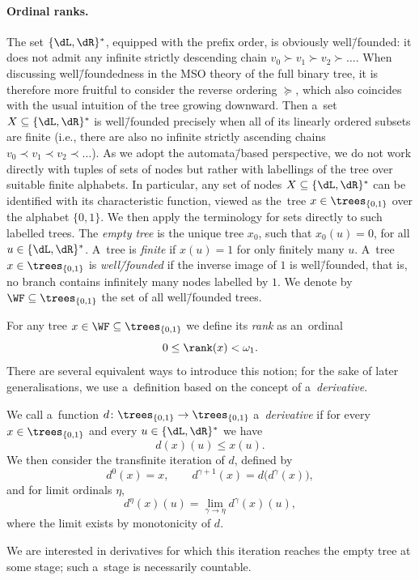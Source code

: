 \documentclass{lmcs}
\numberwithin{equation}{section}
\numberwithin{figure}{section}
\begin{document}
\paragraph*{Ordinal ranks.}
The set $\{\dL,\dR\}^\ast$,
equipped with the prefix order, is obviously well\=/founded: it does not admit any infinite strictly descending chain $v_0 \succ v_1 \succ v_2 \succ \ldots$.
When discussing well\=/foundedness in the MSO theory of the full binary tree, it is therefore more fruitful to consider the reverse ordering
$\succeq$, which also coincides with the usual intuition of the tree growing downward.
Then a~set $X \subseteq \{\dL,\dR\}^\ast$ is well\=/founded precisely when all of its linearly ordered subsets are finite
(i.e., there are also no infinite strictly ascending chains $v_0 \prec v_1 \prec v_2 \prec \ldots$).
As we adopt the automata\=/based perspective, we do not work directly with tuples of
sets of nodes but rather with labellings of the tree over suitable finite alphabets. In particular, any set of nodes
$X\subseteq \{\dL,\dR\}^\ast$ can be identified with its characteristic function, viewed as the~tree $x\in\trees_{\{0,1\}}$ over the alphabet $\{0,1\}$.
We then apply the terminology for sets directly to such labelled trees.
The \emph{empty tree} is the unique tree $x_0$, such that $x_0(u)=0$, for all $u\in\{\dL,\dR\}^\ast$.
A~tree is \emph{finite} if $x(u)=1$ for only finitely many $u$.
A~tree $x\in\trees_{\{0,1\}}$ is \emph{well\=/founded} if the inverse image of $1$ is well\=/founded, that is, no branch contains infinitely many nodes labelled by $1$.
We denote by $\WF\subseteq\trees_{\{0,1\}}$ the
set of all well\=/founded trees.

For any tree $x \in \WF \subseteq \trees_{\{0,1\}}$ we define its \emph{rank} as an~ordinal
\[ 0 \leq \rank(x) < \omega_1. \]
There are several equivalent ways to introduce this notion; for the sake of later generalisations, we use a~definition based on the concept of a~\emph{derivative}.

We call a~function $d \colon \trees_{\{0,1\}} \to \trees_{\{0,1\}}$ a~\emph{derivative} if for every $x \in \trees_{\{0,1\}}$ and every $u \in \{\dL,\dR\}^\ast$ we have
\[ d(x)(u) \leq x(u). \]
We then consider the transfinite iteration of $d$, defined by
\[
d^0(x) = x,\qquad
d^{\gamma+1}(x) = d\bigl(d^\gamma(x)\bigr),
\]
and for limit ordinals $\eta$,
\[
d^\eta(x)(u) = \lim_{\gamma \to \eta} d^\gamma(x)(u),
\]
where the limit exists by monotonicity of $d$.

We are interested in derivatives for which this iteration reaches the empty tree at some stage; such a~stage is necessarily countable.
\end{document}
